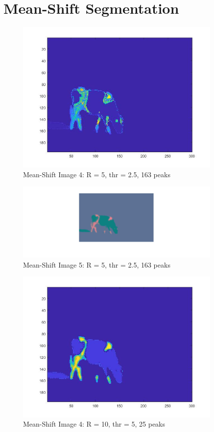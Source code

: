\documentclass[12pt]{article}
\begin{document}
\section{Mean-Shift Segmentation}

\vspace{5mm}
\begin{figure}[ht]
	\centering
	\includegraphics[width=0.9\textwidth]{r5p163a.jpg}
	\caption{Mean-Shift Image 4: R = 5, thr = 2.5, 163 peaks}
	\label{fig1}
\end{figure}
\vspace{5mm}
\begin{figure}[ht]
	\centering
	\includegraphics[width=0.9\textwidth]{r5p163b.jpg}
	\caption{Mean-Shift Image 5: R = 5, thr = 2.5, 163 peaks}
	\label{fig1}
\end{figure}
\vspace{5mm}
\begin{figure}[ht]
	\centering
	\includegraphics[width=0.9\textwidth]{r10p25a.jpg}
	\caption{Mean-Shift Image 4: R = 10, thr = 5, 25 peaks}
	\label{fig1}
\end{figure}
\end{document}
